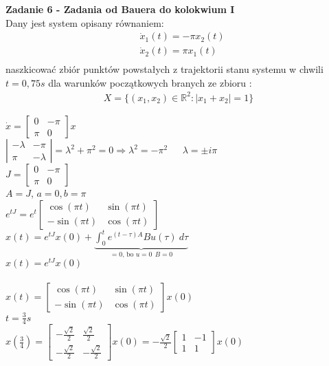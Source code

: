 \documentclass[a4paper,11pt]{article}
\begin{document}
\newpage
\begin{framed}
\textbf{Zadanie 6 - Zadania od Bauera do kolokwium I } \\ 
Dany jest system opisany równaniem:
\begin{align*}
&\dot{x}_1(t)=-\pi x_2(t) \\
&\dot{x}_2(t)=\pi x_1(t) \\
\end{align*}
naszkicować zbiór punktów powstałych z trajektorii stanu systemu w chwili \( t = 0,75 s \) dla warunków początkowych branych ze zbioru :
\begin{align*}
X = \{ (x_1,x_2)\in \mathbb{R}^2 : |x_1+x_2|=1 \}
\end{align*}
\end{framed}

$\dot{x}=\left[\begin{array}{cc}0&-\pi\\\pi&0\end{array}\right]x$\\
$\left|\begin{array}{cc}-\lambda&-\pi\\\pi&-\lambda\end{array}\right|=\lambda^2+\pi^2=0\Rightarrow\lambda^2=-\pi^2 \ \ \ \ \ \ \ \lambda=\pm i\pi$\\
$J=\left[\begin{array}{cc}0&-\pi\\\pi&0\end{array}\right]$\\
$A = J$, $a=0, b=\pi$\\
$e^{tJ}=e^{t}\left[\begin{array}{cc}\cos(\pi t)&\sin(\pi t)\\-\sin(\pi t)&\cos(\pi t)\end{array}\right]$\\
$x(t)=e^{tJ}x(0)+\underbrace{\int_0^te^{(t-\tau)A}Bu(\tau)\ d\tau}_{=0 \text{, \ bo }u=0 \ \ B=0}$\\
$x(t)=e^{tJ}x(0)$\\\\
$x(t)=\left[\begin{array}{cc}\cos(\pi t)&\sin(\pi t)\\-\sin(\pi t)&\cos(\pi t)\end{array}\right]x(0)$\\
$t=\frac 34 s$\\
$x(\frac 34)=\left[\begin{array}{cc}-\frac{\sqrt{2}}{2}&\frac{\sqrt{2}}{2}\\-\frac{\sqrt{2}}{2}&-\frac{\sqrt{2}}{2}\end{array}\right]x(0)=-\frac{\sqrt{2}}{2}\left[\begin{array}{cc}1&-1\\1&1\end{array}\right]x(0)$\\
\end{document}
